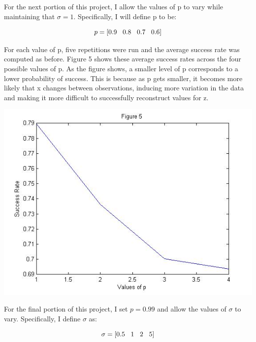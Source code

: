 \documentclass[12pt]{article} %
\begin{document}
\vspace{3mm}
For the next portion of this project, I allow the values of p to vary while maintaining that $\sigma = 1$. Specifically, I will define p to be:

\vspace{1mm}
\begin{equation*}
p = [0.9 \hspace{3mm} 0.8 \hspace{3mm} 0.7 \hspace{3mm} 0.6]
\end{equation*}

\vspace{3mm}
For each value of p, five repetitions were run and the average success rate was computed as before. Figure 5 shows these average success rates across the four possible values of p. As the figure shows, a smaller level of p corresponds to a lower probability of success. This is because as p gets smaller, it becomes more likely that x changes between observations, inducing more variation in the data and making it more difficult to successfully reconstruct values for z.

\begin{center}
\includegraphics[scale = 0.5]{figure5}
\end{center}

For the final portion of this project, I set $p = 0.99$ and allow the values of $\sigma$ to vary. Specifically, I define $\sigma$ as:

\begin{equation*}
\sigma = [0.5 \hspace{3mm} 1 \hspace{3mm} 2 \hspace{3mm} 5]
\end{equation*}
\end{document}
